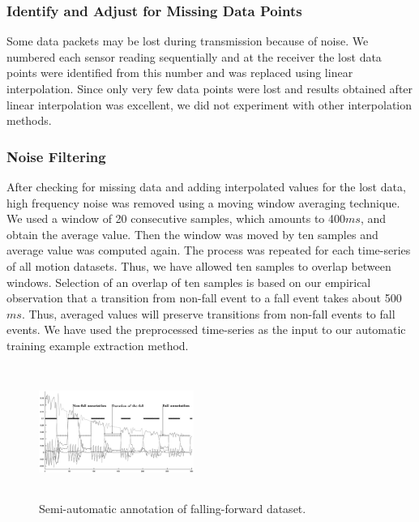 \documentclass[]{IEEEtran}
\begin{document}
\subsubsection{Identify and Adjust for Missing Data Points}
\label{sec:IdentifyAndAdjustForMissingDataPoints} Some data packets may be lost
during transmission because of noise. We numbered each sensor reading
sequentially and at the receiver the lost data points were identified from this
number and was replaced using linear interpolation. Since only very few data
points were lost and results obtained after linear interpolation was excellent,
we did not experiment with other interpolation methods.


\subsubsection{Noise Filtering}
\label{sec:NoiseFiltering}

After checking for missing data and adding interpolated values for the lost
data,  high frequency noise was removed using a moving window averaging
technique. We used a window  of 20 consecutive samples, which amounts to
400$ms$, and obtain the average value. Then the  window was moved by ten
samples and average  value was computed again. The process was repeated for
each time-series of all motion datasets. Thus, we have allowed ten samples to
overlap between windows.  Selection of an overlap of ten samples is based on
our empirical observation that a transition from non-fall event to a fall event
takes about 500$ms$. Thus, averaged values will preserve transitions from
non-fall events to fall events.   We have used the preprocessed time-series as
the input to our automatic training example extraction method.

\begin{figure}[b]
\centering
\includegraphics[width=0.45\textwidth,height=1.7in]{plots/human_falling_forward2_bw.eps} 
\caption{Semi-automatic annotation of falling-forward dataset.}
 \label{fig:automatic_annotation} 
\end{figure}
\end{document}
